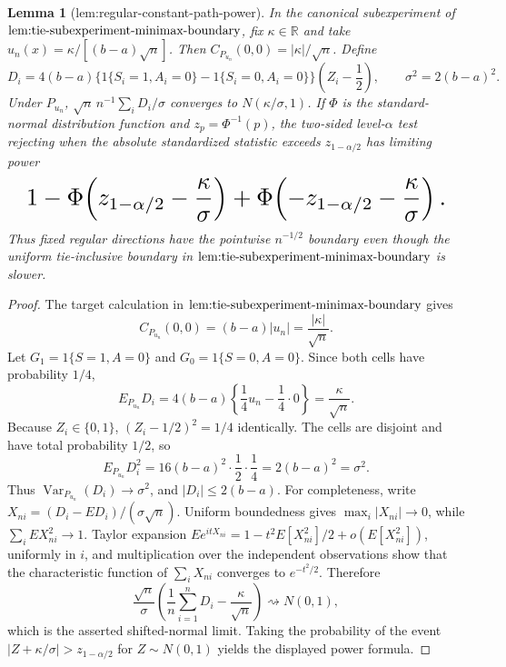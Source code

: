 \documentclass{article}
\newtheorem{lemma}{Lemma}
\begin{document}
\begin{lemma}[lem:regular-constant-path-power]\label{lem:regular-constant-path-power}
In the canonical subexperiment of \(\textup{lem:tie-subexperiment-minimax-boundary}\), fix \(\kappa\in\mathbb R\) and take \(u_n(x)=\kappa/[(b-a)\sqrt n]\). Then \(C_{P_{u_n}}(0,0)=|\kappa|/\sqrt n\). Define\[D_i=4(b-a)\{1\{S_i=1,A_i=0\}-1\{S_i=0,A_i=0\}\}\left(Z_i-\frac12\right),\qquad \sigma^2=2(b-a)^2.\]Under \(P_{u_n}\), \(\sqrt n\,n^{-1}\sum_iD_i/\sigma\) converges to \(N(\kappa/\sigma,1)\). If \(\Phi\) is the standard-normal distribution function and \(z_p=\Phi^{-1}(p)\), the two-sided level-\(\alpha\) test rejecting when the absolute standardized statistic exceeds \(z_{1-\alpha/2}\) has limiting power\[
\makebox[\linewidth][c]{\resizebox{0.98\linewidth}{!}{\par\noindent \makebox[\linewidth][c]{\resizebox{0.98\linewidth}{!}{\(\displaystyle \displaystyle 1-\Phi\!\left(z_{1-\alpha/2}-\frac{\kappa}{\sigma}\right)+\Phi\!\left(-z_{1-\alpha/2}-\frac{\kappa}{\sigma}\right).\)}}\par\noindent}}
\]Thus fixed regular directions have the pointwise \(n^{-1/2}\) boundary even though the uniform tie-inclusive boundary in \(\textup{lem:tie-subexperiment-minimax-boundary}\) is slower.
\end{lemma}
\begin{proof}
The target calculation in \(\textup{lem:tie-subexperiment-minimax-boundary}\) gives\[C_{P_{u_n}}(0,0)=(b-a)|u_n|=\frac{|\kappa|}{\sqrt n}.\]Let \(G_1=1\{S=1,A=0\}\) and \(G_0=1\{S=0,A=0\}\). Since both cells have probability \(1/4\),\[E_{P_{u_n}}D_i=4(b-a)\left\{\frac14u_n-\frac14\cdot0\right\}=\frac{\kappa}{\sqrt n}.\]Because \(Z_i\in\{0,1\}\), \((Z_i-1/2)^2=1/4\) identically. The cells are disjoint and have total probability \(1/2\), so\[E_{P_{u_n}}D_i^2=16(b-a)^2\cdot\frac12\cdot\frac14=2(b-a)^2=\sigma^2.\]Thus \(\operatorname{Var}_{P_{u_n}}(D_i)\to\sigma^2\), and \(|D_i|\le2(b-a)\). For completeness, write \(X_{ni}=(D_i-E D_i)/(\sigma\sqrt n)\). Uniform boundedness gives \(\max_i|X_{ni}|\to0\), while \(\sum_iE X_{ni}^2\to1\). Taylor expansion \(E e^{itX_{ni}}=1-t^2E[X_{ni}^2]/2+o(E[X_{ni}^2])\), uniformly in \(i\), and multiplication over the independent observations show that the characteristic function of \(\sum_iX_{ni}\) converges to \(e^{-t^2/2}\). Therefore\[\frac{\sqrt n}{\sigma}\left(\frac1n\sum_{i=1}^nD_i-\frac{\kappa}{\sqrt n}\right)\rightsquigarrow N(0,1),\]which is the asserted shifted-normal limit. Taking the probability of the event \(|Z+\kappa/\sigma|>z_{1-\alpha/2}\) for \(Z\sim N(0,1)\) yields the displayed power formula.
\end{proof}
\end{document}
